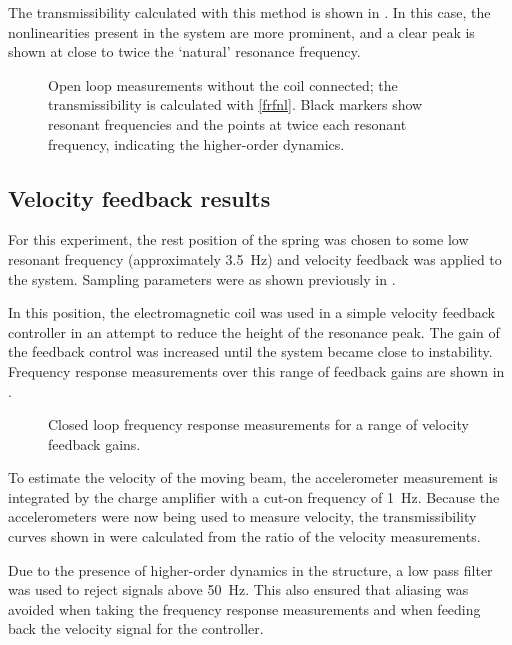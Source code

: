 \documentclass[11pt,a4paper]{memoir}
\begin{document}
The transmissibility calculated with this method is shown in
. In this case, the nonlinearities present in the
system are more prominent, and a clear peak is shown at close to twice the
`natural' resonance frequency.

\begin{figure}
  \caption{Open loop measurements without the coil connected; the transmissibility is calculated with \eqref{frfnl}. Black markers show resonant frequencies and the points at twice each resonant frequency, indicating the higher-order dynamics.}
\end{figure}

\subsection{Velocity feedback results}

For this experiment, the rest position of the spring was chosen to some low
resonant frequency (approximately \SI{3.5}{Hz}) and velocity feedback was applied
to the system. Sampling parameters were as shown previously in
.

In this position, the electromagnetic coil was used in a simple velocity
feedback controller in an attempt to reduce the height of the resonance peak.
The gain of the feedback control was increased until the system became close
to instability. Frequency response measurements over this range of feedback
gains are shown in .

\begin{figure}
  \caption{Closed loop frequency response measurements for a range of velocity feedback gains.}
\end{figure}

To estimate the velocity of the moving beam, the accelerometer measurement is
integrated by the charge amplifier with a cut-on frequency of \SI{1}{Hz}.
Because the accelerometers were now being used to measure velocity, the
transmissibility curves shown in  were calculated from the
ratio of the velocity measurements.

Due to the presence of higher-order dynamics in the structure, a low pass
filter was used to reject signals above \SI{50}{Hz}. This also ensured that
aliasing was avoided when taking the frequency response measurements and when
feeding back the velocity signal for the controller.
\end{document}
